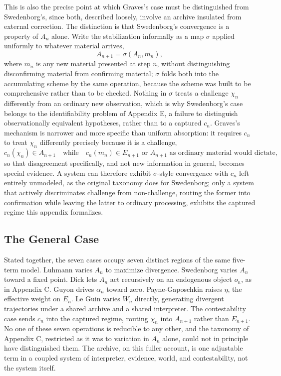 \documentclass[11pt]{article}
\begin{document}
This is also the precise point at which Graves's case must be distinguished from Swedenborg's, since both, described loosely, involve an archive insulated from external correction. The distinction is that Swedenborg's convergence is a property of $A_n$ alone. Write the stabilization informally as a map $\sigma$ applied uniformly to whatever material arrives,
\[
A_{n+1} = \sigma(A_n, m_n),
\]
where $m_n$ is any new material presented at step $n$, without distinguishing disconfirming material from confirming material; $\sigma$ folds both into the accumulating scheme by the same operation, because the scheme was built to be comprehensive rather than to be checked. Nothing in $\sigma$ treats a challenge $\chi_n$ differently from an ordinary new observation, which is why Swedenborg's case belongs to the identifiability problem of Appendix E, a failure to distinguish observationally equivalent hypotheses, rather than to a captured $c_n$. Graves's mechanism is narrower and more specific than uniform absorption: it requires $c_n$ to treat $\chi_n$ differently precisely because it is a challenge,
\[
c_n(\chi_n) \in A_{n+1}
\quad\text{while}\quad
c_n(m_n) \in E_{n+1} \text{ or } A_{n+1} \text{ as ordinary material would dictate,}
\]
so that disagreement specifically, and not new information in general, becomes special evidence. A system can therefore exhibit $\sigma$-style convergence with $c_n$ left entirely unmodeled, as the original taxonomy does for Swedenborg; only a system that actively discriminates challenge from non-challenge, routing the former into confirmation while leaving the latter to ordinary processing, exhibits the captured regime this appendix formalizes.

\subsection*{The General Case}

Stated together, the seven cases occupy seven distinct regions of the same five-term model. Luhmann varies $A_n$ to maximize divergence. Swedenborg varies $A_n$ toward a fixed point. Dick lets $A_n$ act recursively on an endogenous object $o_n$, as in Appendix C. Guyon drives $\alpha_n$ toward zero. Payne-Gaposchkin raises $\eta$, the effective weight on $E_n$. Le Guin varies $W_n$ directly, generating divergent trajectories under a shared archive and a shared interpreter. The contestability case sends $c_n$ into the captured regime, routing $\chi_n$ into $A_{n+1}$ rather than $E_{n+1}$. No one of these seven operations is reducible to any other, and the taxonomy of Appendix C, restricted as it was to variation in $A_n$ alone, could not in principle have distinguished them. The archive, on this fuller account, is one adjustable term in a coupled system of interpreter, evidence, world, and contestability, not the system itself.
\end{document}
